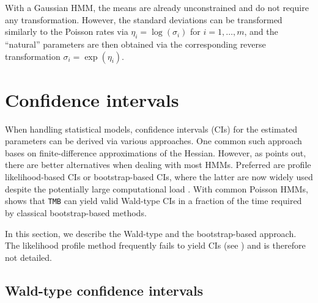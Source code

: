 \documentclass[]{interact}\usepackage[]{graphicx}\usepackage[dvipsnames]{xcolor}
\theoremstyle{plain}%
\theoremstyle{definition}
\theoremstyle{remark}
\begin{document}
With a Gaussian HMM, the means are already unconstrained and do not require any transformation.
However, the standard deviations can be transformed similarly to the Poisson rates via $\eta_i = \log(\sigma_i)$ for $i = 1, \ldots, m$, and the ``natural'' parameters are then obtained via the corresponding reverse transformation $\sigma_i = \exp(\eta_i)$.


\section{Confidence intervals}
\label{sec:appendix-cis}

When handling statistical models, confidence intervals (CIs) for the estimated parameters can be derived via various approaches. One common such approach bases on finite-difference approximations of the Hessian. However, as \cite{visser} points out, there are better alternatives when dealing with most HMMs. Preferred are profile likelihood-based CIs or bootstrap-based CIs, where the latter are now widely used despite the potentially large computational load \citep{bulla, zucchini}. With common Poisson HMMs, \cite{bacri} shows that {\tt{TMB}} can yield valid Wald-type CIs in a fraction of the time required by classical bootstrap-based methods.

In this section, we describe the Wald-type and the bootstrap-based approach. The likelihood profile method frequently fails to yield CIs (see \citep{bacri}) and is therefore not detailed.



\subsection{Wald-type confidence intervals}
\label{sec:appendix-wald}
\end{document}
